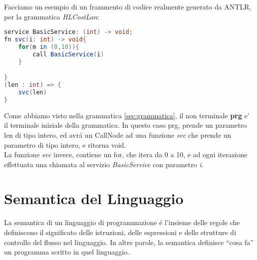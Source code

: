 \documentclass[../../main.tex]{subfiles}
\begin{document}
Facciamo un esempio di un frammento di codice realmente generato da ANTLR, per la grammatica \textit{HLCostLan}:
\begin{lstlisting}[language=Java, caption={Esempio di codice HLCostLan: example/Listing6}, label={lst:example_code}]
service BasicService: (int) -> void;
fn svc(i: int) -> void{
    for(m in (0,10)){
        call BasicService(i)
    }

}
(len : int) => {
	svc(len)
}
\end{lstlisting}

Come abbiamo visto nella grammatica \ref{sec:grammatica}, il non terminale \textbf{prg} e' il terminale iniziale della grammatica. In questo caso prg, prende un parametro len di tipo intero, ed avrá un CallNode ad una funzione \textit{svc} che prende un parametro di tipo intero, e ritorna void.\\
La funzione \textit{svc} invece, contiene un for, che itera da 0 a 10, e ad ogni iterazione effettuata una chiamata al servizio \textit{BasicService} con parametro \textit{i}.\\



\section{Semantica del Linguaggio}\label{sec:semantica}
La semantica di un linguaggio di programmazione é l'insieme delle regole che definiscono il significato delle istruzioni, delle espressioni e delle strutture di controllo del flusso nel linguaggio. In altre parole, la semantica definisce ``cosa fa'' un programma scritto in quel linguaggio.
\end{document}

